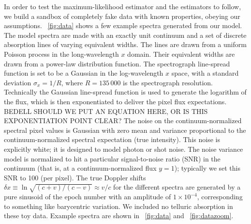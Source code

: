 \documentclass[modern]{aastex631}
\newcommand{\figref}[1]{\figurename~\ref{#1}}
\begin{document}
In order to test the maximum-likelihood estimator and the estimators to follow, we build a sandbox of completely fake data with known properties, obeying our assumptions.
\figref{fig:data} shows a few example spectra generated from our model.
The model spectra are made with an exactly unit continuum and a set of discrete absorption lines of varying equivalent widths.
The lines are drawn from a uniform Poisson process in the long-wavelength $x$ domain.
Their equivalent widths are drawn from a power-law distribution function.
The spectrograph line-spread function is set to be a Gaussian in the log-wavelength $x$ space, with a standard deviation $\sigma_x=1/R$, where $R=135\,000$ is the spectrograph resolution.
Technically the Gaussian line-spread function is used to generate the logarithm of the flux, which is then exponentiated to deliver the pixel flux expectations.
BEDELL SHOULD WE PUT AN EQUATION HERE, OR IS THIS EXPONENTIATION POINT CLEAR?
The noise on the continuum-normalized spectral pixel values is Gaussian with zero mean and variance proportional to the continuum-normalized spectral expectation (true intensity).
This noise is explicitly white; it is designed to model photon or shot noise.
The noise variance model is normalized to hit a particular signal-to-noise ratio (SNR) in the continuum (that is, at a continuum-normalized flux $y=1$); typically we set this SNR to 100 (per pixel).
The true Doppler shifts $\delta x\equiv\ln\sqrt{(c+v)/(c-v)}\approx v/c$ for the different spectra are generated by a pure sinusoid of the epoch number with an amplitude of $1\times10^{-4}$, corresponding to something like barycentric variation.
We included no telluric absorption in these toy data.
Example spectra are shown in \figref{fig:data} and \figref{fig:datazoom}.
\end{document}
